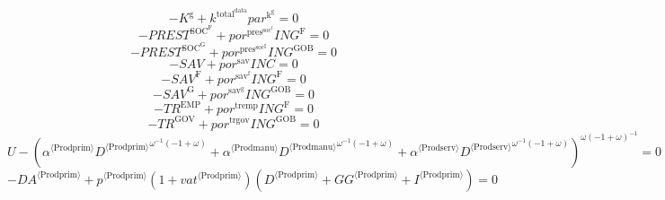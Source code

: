 \begin{equation}
-K^{\mathrm{g}} + {k^{\mathrm{total}^{\mathrm{data}}}} {{p\!a\!r}^{\mathrm{k}^{\mathrm{g}}}} = 0
\end{equation}
\begin{equation}
-{P\!R\!E\!S\!T}^{\mathrm{SOC}^{\mathrm{F}}} + {{p\!o\!r}^{\mathrm{pres}^{\mathrm{soc}^{\mathrm{f}}}}} {{I\!N\!G}^{\mathrm{F}}} = 0
\end{equation}
\begin{equation}
-{P\!R\!E\!S\!T}^{\mathrm{SOC}^{\mathrm{G}}} + {{p\!o\!r}^{\mathrm{pres}^{\mathrm{soc}^{\mathrm{g}}}}} {{I\!N\!G}^{\mathrm{GOB}}} = 0
\end{equation}
\begin{equation}
-{S\!A\!V} + {{p\!o\!r}^{\mathrm{sav}}} {{I\!N\!C}} = 0
\end{equation}
\begin{equation}
-{S\!A\!V}^{\mathrm{F}} + {{p\!o\!r}^{\mathrm{sav}^{\mathrm{f}}}} {{I\!N\!G}^{\mathrm{F}}} = 0
\end{equation}
\begin{equation}
-{S\!A\!V}^{\mathrm{G}} + {{p\!o\!r}^{\mathrm{sav}^{\mathrm{g}}}} {{I\!N\!G}^{\mathrm{GOB}}} = 0
\end{equation}
\begin{equation}
-{T\!R}^{\mathrm{EMP}} + {{p\!o\!r}^{\mathrm{tremp}}} {{I\!N\!G}^{\mathrm{F}}} = 0
\end{equation}
\begin{equation}
-{T\!R}^{\mathrm{GOV}} + {{p\!o\!r}^{\mathrm{trgov}}} {{I\!N\!G}^{\mathrm{GOB}}} = 0
\end{equation}
\begin{equation}
U - \left({{\alpha}^{\langle \mathrm{\mathrm{Prodprim}}\rangle}} {{{D}^{\langle \mathrm{Prodprim}\rangle}}^{{\omega}^{-1} \left(-1 + \omega\right)}} + {{\alpha}^{\langle \mathrm{\mathrm{Prodmanu}}\rangle}} {{{D}^{\langle \mathrm{Prodmanu}\rangle}}^{{\omega}^{-1} \left(-1 + \omega\right)}} + {{\alpha}^{\langle \mathrm{\mathrm{Prodserv}}\rangle}} {{{D}^{\langle \mathrm{Prodserv}\rangle}}^{{\omega}^{-1} \left(-1 + \omega\right)}}\right)^{{\omega} \left(-1 + \omega\right)^{-1}} = 0
\end{equation}
\begin{equation}
-{{D\!A}}^{\langle \mathrm{Prodprim}\rangle} + {{p}^{\langle \mathrm{Prodprim}\rangle}} \left(1 + {{v\!a\!t}}^{\langle \mathrm{\mathrm{Prodprim}}\rangle}\right) \left({D}^{\langle \mathrm{Prodprim}\rangle} + {{G\!G}}^{\langle \mathrm{Prodprim}\rangle} + {I}^{\langle \mathrm{Prodprim}\rangle}\right) = 0
\end{equation}

